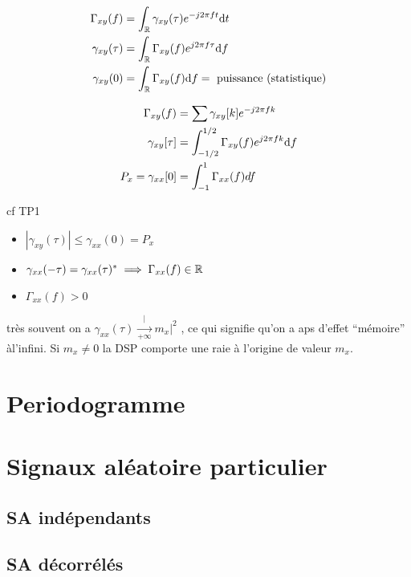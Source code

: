 \documentclass[main.tex]{subfiles}
\begin{document}
\begin{prop}[Cas du TC]
  \begin{align*}
    \Gamma_{xy}(f) &= \int_{\mathbb{R}} \gamma_{xy}(\tau) e^{-j2\pi ft} \mbox{d} t\\
    \gamma_{xy}(\tau) & =\int_{\mathbb{R}} \Gamma_{xy}(f) e^{j 2\pi f\tau} \mbox{d} f\\
   \gamma_{xy}(0) & = \int_{\mathbb{R}} \Gamma_{xy}(f) \mbox{d} f  = \text{ puissance (statistique)}\\
  \end{align*}
\end{prop}
\begin{prop}[Cas du TD]
  \begin{align*}
    \Gamma_{xy}(f) &=\sum \gamma_{xy}[k] e^{-j 2 \pi fk}\\
    \gamma_{xy}[\tau] & = \int_{-1/2}^{1/2} \Gamma_{xy}(f)e^{j 2\pi f k} \mbox{d} f\\
    P_x = \gamma_{xx}[0] &= \int_{-1}^{1} \Gamma_{xx}(f)df
  \end{align*}
\end{prop}
\begin{exemple} cf TP1
\end{exemple}

\begin{prop}
  \begin{itemize}
  \item $|\gamma_{xy}(\tau)| \le \gamma_{xx}(0) =P_x$ 
  \item $\gamma_{xx}(-\tau)= \gamma_{xx}(\tau)^* \implies \Gamma_{xx}(f) \in \mathbb{R}$
  \item $\Gamma_{xx}(f)>0$
  \end{itemize}
\end{prop}
\begin{rem}
  très souvent on a $\gamma_{xx}(\tau) \xrightarrow[+\infty] |m_x|^2$ , ce qui signifie qu'on a aps d'effet  ``mémoire'' àl'infini. Si $m_x \neq 0$ la DSP  comporte une raie à l'origine de valeur $m_x$.
\end{rem}

\section{Periodogramme}



\section{Signaux aléatoire particulier}
\subsection{SA indépendants}
\subsection{SA décorrélés}
\end{document}
